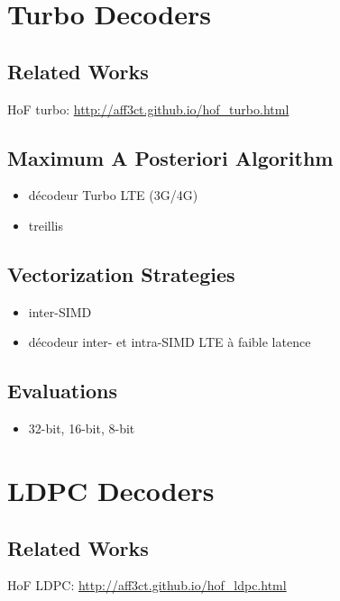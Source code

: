 \section{Turbo Decoders~\cite{Cassagne2016a}}

\subsection{Related Works}

HoF turbo: \url{http://aff3ct.github.io/hof_turbo.html}

\subsection{Maximum A Posteriori Algorithm}

\begin{itemize}
  \item décodeur Turbo LTE (3G/4G)
  \item treillis
\end{itemize}

\subsection{Vectorization Strategies}

\begin{itemize}
  \item inter-SIMD
  \item décodeur inter- et intra-SIMD LTE à faible latence
\end{itemize}

\subsection{Evaluations}

\begin{itemize}
  \item 32-bit, 16-bit, 8-bit
\end{itemize}

\section{LDPC Decoders}

\subsection{Related Works}

HoF LDPC: \url{http://aff3ct.github.io/hof_ldpc.html}

